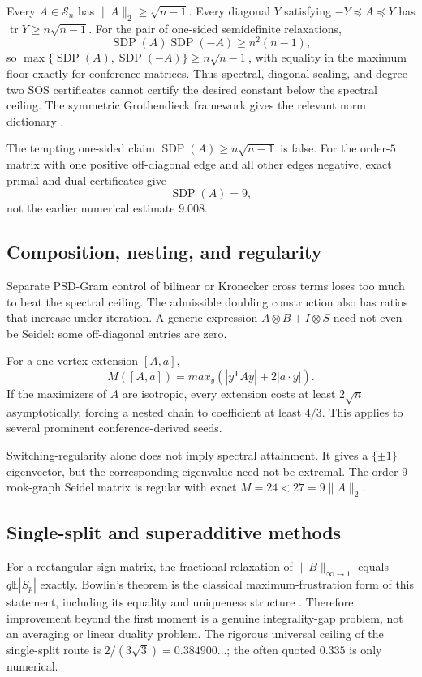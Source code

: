 \documentclass[11pt]{article}
\theoremstyle{definition}
\theoremstyle{remark}
\newcommand{\Sn}{\mathcal S_n}
\newcommand{\E}{\mathbb E}
\newcommand{\SDP}{\operatorname{SDP}}
\begin{document}
Every $A\in\Sn$ has $\|A\|_2\ge\sqrt{n-1}$.  Every diagonal $Y$ satisfying
$-Y\preceq A\preceq Y$ has
$\operatorname{tr}Y\ge n\sqrt{n-1}$.  For the pair of one-sided semidefinite
relaxations,
\[
 \SDP(A)\SDP(-A)\ge n^2(n-1),
\]
so $\max\{\SDP(A),\SDP(-A)\}\ge n\sqrt{n-1}$, with equality in the maximum
floor exactly for conference matrices.  Thus spectral, diagonal-scaling, and
degree-two SOS certificates cannot certify the desired constant below the
spectral ceiling.  The symmetric Grothendieck framework gives the relevant
norm dictionary \cite{friedland-lim}.

The tempting one-sided claim $\SDP(A)\ge n\sqrt{n-1}$ is false.  For the
order-$5$ matrix with one positive off-diagonal edge and all other edges
negative, exact primal and dual certificates give
\[
 \SDP(A)=9,
\]
not the earlier numerical estimate $9.008$.

\subsection{Composition, nesting, and regularity}

Separate PSD-Gram control of bilinear or Kronecker cross terms loses too much
to beat the spectral ceiling.  The admissible doubling construction also has
ratios that increase under iteration.  A generic expression
$A\otimes B+I\otimes S$ need not even be Seidel: some off-diagonal entries are
zero.

For a one-vertex extension $[A,a]$,
\[
 M([A,a])=max_y\left(|y^{\mathsf T}Ay|+2|a\cdot y|\right).
\]
If the maximizers of $A$ are isotropic, every extension costs at least
$2\sqrt n$ asymptotically, forcing a nested chain to coefficient at least
$4/3$.  This applies to several prominent conference-derived seeds.

Switching-regularity alone does not imply spectral attainment.  It gives a
$\{\pm1\}$ eigenvector, but the corresponding eigenvalue need not be
extremal.  The order-$9$ rook-graph Seidel matrix is regular with exact
$M=24<27=9\|A\|_2$.

\subsection{Single-split and superadditive methods}

For a rectangular sign matrix, the fractional relaxation of
$\|B\|_{\infty\to1}$ equals $q\E|S_p|$ exactly.  Bowlin's theorem is the
classical maximum-frustration form of this statement, including its equality
and uniqueness structure \cite{bowlin}.  Therefore improvement beyond the
first moment is a genuine integrality-gap problem, not an averaging or linear
duality problem.  The rigorous universal ceiling of the single-split route is
$2/(3\sqrt3)=0.384900\ldots$; the often quoted $0.335$ is only numerical.
\end{document}
